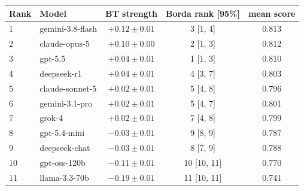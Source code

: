 \begin{tabular}{llccc}
\toprule
Rank & Model & BT strength & Borda rank [95\%] & mean score \\
\midrule
1 & gemini-3.8-flash & $+0.12 \pm 0.01$ & 3 [1, 4] & 0.813 \\
2 & claude-opus-5 & $+0.10 \pm 0.00$ & 2 [1, 3] & 0.812 \\
3 & gpt-5.5 & $+0.04 \pm 0.01$ & 1 [1, 3] & 0.810 \\
4 & deepseek-r1 & $+0.04 \pm 0.01$ & 4 [3, 7] & 0.803 \\
5 & claude-sonnet-5 & $+0.02 \pm 0.01$ & 5 [4, 8] & 0.796 \\
6 & gemini-3.1-pro & $+0.02 \pm 0.01$ & 5 [4, 7] & 0.801 \\
7 & grok-4 & $+0.02 \pm 0.01$ & 7 [4, 8] & 0.799 \\
8 & gpt-5.4-mini & $-0.03 \pm 0.01$ & 9 [8, 9] & 0.787 \\
9 & deepseek-chat & $-0.03 \pm 0.01$ & 8 [7, 9] & 0.788 \\
10 & gpt-oss-120b & $-0.11 \pm 0.01$ & 10 [10, 11] & 0.770 \\
11 & llama-3.3-70b & $-0.19 \pm 0.01$ & 11 [10, 11] & 0.741 \\
\bottomrule
\end{tabular}
